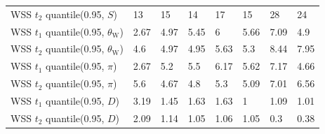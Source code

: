 \documentclass[a4paper, 12pt]{article}
\begin{document}
\begin{tiny}
\begin{longtable}{p{3.0cm}p{1.0cm}p{1.0cm}p{1.0cm}p{1.0cm}p{1.0cm}p{1.0cm}p{1.0cm}}
WSS $t_2$ quantile(0.95, $S$) & 13 & 15 & 14 & 17 & 15 & 28 & 24 \\
WSS $t_1$ quantile(0.95, $\theta_{\mathrm{W}}$) & 2.67 & 4.97 & 5.45 & 6 & 5.66 & 7.09 & 4.9 \\
WSS $t_2$ quantile(0.95, $\theta_{\mathrm{W}}$) & 4.6 & 4.97 & 4.95 & 5.63 & 5.3 & 8.44 & 7.95 \\
WSS $t_1$ quantile(0.95, $\pi$) & 2.67 & 5.2 & 5.5 & 6.17 & 5.62 & 7.17 & 4.66 \\
WSS $t_2$ quantile(0.95, $\pi$) & 5.6 & 4.67 & 4.8 & 5.3 & 5.09 & 7.01 & 6.56 \\
WSS $t_1$ quantile(0.95, $D$) & 3.19 & 1.45 & 1.63 & 1.63 & 1 & 1.09 & 1.01 \\
WSS $t_2$ quantile(0.95, $D$) & 2.09 & 1.14 & 1.05 & 1.06 & 1.05 & 0.3 & 0.38 \\

\end{longtable}
\end{tiny}







\newpage
\end{document}
